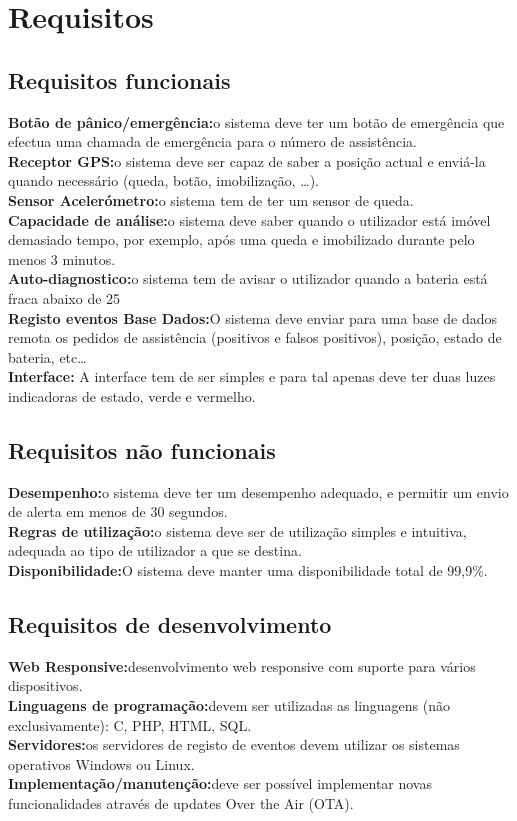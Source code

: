 \section{Requisitos}
\subsection{Requisitos funcionais}
\textbf{Botão de pânico/emergência:}o sistema deve ter um botão de emergência que efectua uma chamada de emergência para o número de assistência.
\\
\textbf{Receptor GPS:}o sistema deve ser capaz de saber a posição actual e enviá-la quando necessário (queda, botão, imobilização, …).
\\
\textbf{Sensor Acelerómetro:}o sistema tem de ter um sensor de queda.
\\
\textbf{Capacidade de análise:}o sistema deve saber quando o utilizador está imóvel demasiado tempo, por exemplo, após uma queda e imobilizado durante pelo menos 3 minutos.
\\
\textbf{Auto-diagnostico:}o sistema tem de avisar o utilizador quando a bateria está fraca abaixo de 25%
\\
\textbf{Registo eventos Base Dados:}O sistema deve enviar para uma base de dados remota os pedidos de assistência (positivos e falsos positivos), posição, estado de bateria, etc…
\\
\textbf{Interface:} A interface tem de ser simples e para tal apenas deve ter duas luzes indicadoras de estado, verde e vermelho.

\subsection{Requisitos não funcionais}
\textbf{Desempenho:}o sistema deve ter um desempenho adequado, e permitir um envio de alerta em menos de 30 segundos.
\\
\textbf{Regras de utilização:}o sistema deve ser de utilização simples e intuitiva, adequada ao tipo de utilizador a que se destina.
\\
\textbf{Disponibilidade:}O sistema deve manter uma disponibilidade total de 99,9\%. 

\subsection{Requisitos de desenvolvimento}
\textbf{Web Responsive:}desenvolvimento web responsive com suporte para vários dispositivos.
\\
\textbf{Linguagens de programação:}devem ser utilizadas as linguagens (não exclusivamente): C, PHP, HTML, SQL.
\\
\textbf{Servidores:}os servidores de registo de eventos devem utilizar os sistemas operativos Windows ou Linux.
\\
\textbf{Implementação/manutenção:}deve ser possível implementar novas funcionalidades através de updates Over the Air (OTA).